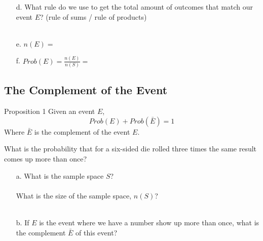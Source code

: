 {\begin{questionNOGRADE}{\thequestion}
\begin{enumerate}
                \item[d.]   What rule do we use to get the total amount of outcomes that match our event $E$? 
                            \footnotesize
                            (rule of sums / rule of products)
                            \normalsize ~\\~\\

                \item[e.]   $n(E) = $ \vspace{1cm}

                \item[f.]   $Prob(E) = \frac{n(E)}{n(S)} = $
            \end{enumerate}
        \end{questionNOGRADE}

    \subsection{The Complement of the Event}
        \begin{intro}{Proposition 1}
            Given an event $E$,
            $$ Prob(E) + Prob(\bar{E}) = 1 $$
            Where $\bar{E}$ is the complement of the event $E$.
        \end{intro}
        
        \begin{questionNOGRADE}{\thequestion}
            What is the probability that for a six-sided die rolled
            three times the same result comes up more than once?

            \begin{enumerate}
                \item[a.]   What is the sample space $S$? ~\\~\\
                            What is the size of the sample space, $n(S)$? ~\\~\\

                \item[b.]   If $E$ is the event where we have a number show up more than once,
                            what is the complement $\bar{E}$ of this event? ~\\~\\



\end{enumerate}
\end{questionNOGRADE}}
